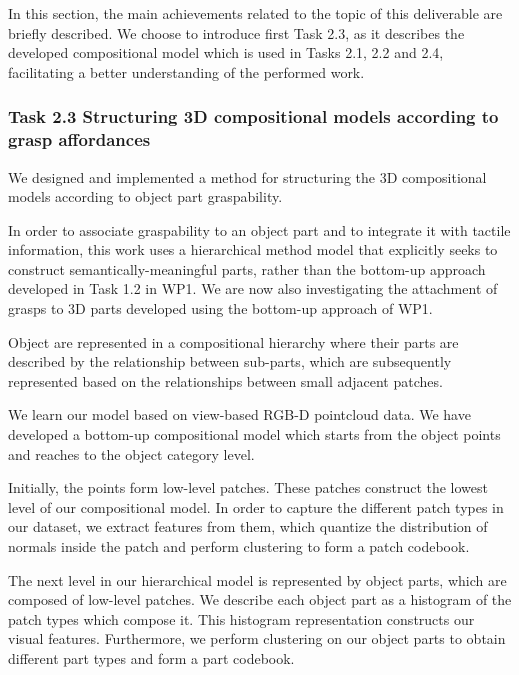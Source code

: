 \documentclass[a4paper,11pt,pdf]{pacmanreport}
\begin{document}
In this section, the main achievements related to the topic of this deliverable are briefly described. 
We choose to introduce first Task 2.3, as it describes the developed compositional model which is used in Tasks 2.1, 2.2 and 2.4, facilitating a better understanding of the performed work.

\subsubsection{Task 2.3 Structuring 3D compositional models according to grasp affordances}

We designed and implemented a method for structuring the 3D compositional models according to object part graspability.

In order to associate graspability to an object part and to integrate it with tactile information, this work uses a hierarchical method model that explicitly seeks to construct semantically-meaningful parts, rather than the bottom-up approach developed in Task 1.2 in WP1. We are now also investigating the attachment of grasps to 3D parts developed using the bottom-up approach of WP1.

Object are represented in a compositional hierarchy where their parts are described by the relationship between sub-parts, which are subsequently represented based on the relationships between small adjacent patches. 

We learn our model based on view-based RGB-D pointcloud data. We have developed a bottom-up compositional model which starts from the object points and reaches to the object category level.

Initially, the points form low-level patches. These patches construct the lowest level of our compositional model. In order to capture the different patch types in our dataset, we extract features from them, which quantize the distribution of normals inside the patch and
perform clustering to form a patch codebook.

The next level in our hierarchical model is represented by object parts, which are composed of low-level patches. We describe each object part as a histogram of the patch types which compose it. This histogram representation constructs our visual features. Furthermore, we perform clustering on our object parts to obtain different part types and form a part codebook.
\end{document}

